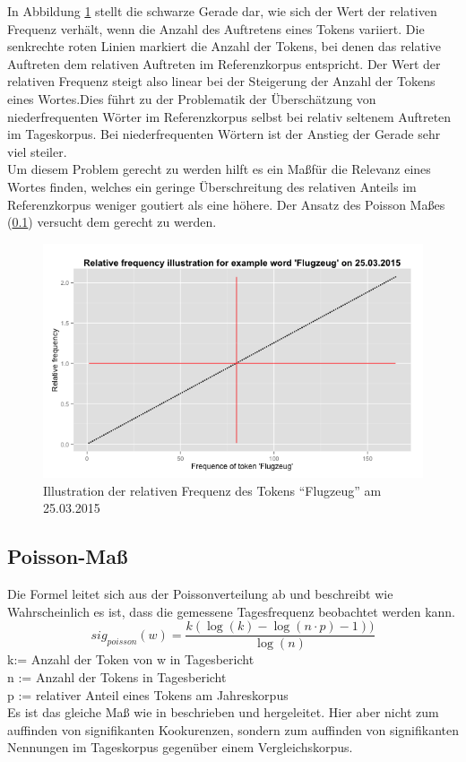 In Abbildung \ref{pic.rel_freq} stellt die schwarze Gerade dar, wie sich der Wert der relativen Frequenz verh\"alt, wenn die Anzahl des Auftretens eines Tokens variiert. Die senkrechte roten Linien markiert die Anzahl der Tokens, bei denen das relative Auftreten dem relativen Auftreten im Referenzkorpus entspricht. Der Wert der relativen Frequenz steigt also linear bei der Steigerung der Anzahl der Tokens eines Wortes.Dies f\"uhrt zu der Problematik der \"Ubersch\"atzung von niederfrequenten W\"orter im Referenzkorpus selbst bei relativ seltenem Auftreten im Tageskorpus. Bei niederfrequenten W\"ortern ist der Anstieg der Gerade sehr viel steiler.\\
Um diesem Problem gerecht zu werden hilft es ein Ma\ss f\"ur die Relevanz eines Wortes finden, welches ein geringe \"Uberschreitung des relativen Anteils im Referenzkorpus weniger goutiert als eine h\"ohere. Der Ansatz des Poisson Ma\ss es (\ref{subsec.poisson}) versucht dem gerecht zu werden.\\
\begin{figure}[h!]
    \centering
    \includegraphics[width=1\textwidth]{pictures/relfreqFlugzeug.png}
    \caption{Illustration der relativen Frequenz des Tokens \enquote{Flugzeug} am 25.03.2015}\label{pic.rel_freq}
\end{figure}



\subsection{Poisson-Maß}\label{subsec.poisson}

Die Formel leitet sich aus der Poissonverteilung ab und beschreibt wie Wahrscheinlich es ist, dass die gemessene Tagesfrequenz beobachtet werden kann. 
\begin{equation}
sig_{poisson}(w) = \frac{k(\log(k)-\log(n\cdot p) -1 ))}{\log(n)}
\end{equation}
k:= Anzahl der Token von w in Tagesbericht\\
n := Anzahl der Tokens in Tagesbericht\\
p := relativer Anteil eines Tokens am Jahreskorpus\\
Es ist das gleiche Maß wie in \cite[S. 338-340]{heyer06} beschrieben und hergeleitet. Hier aber nicht zum auffinden von signifikanten Kookurenzen, sondern zum auffinden von signifikanten Nennungen im Tageskorpus gegenüber einem Vergleichskorpus.\\

